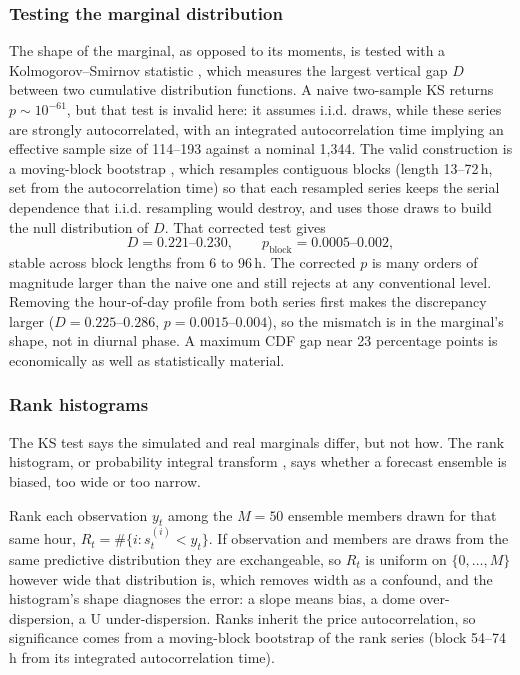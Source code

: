 \documentclass[11pt]{article}
\begin{document}
\subsubsection{Testing the marginal distribution}
The shape of
the marginal, as opposed to its moments, is tested with a
Kolmogorov--Smirnov statistic \cite{massey1951}, which measures the
largest vertical gap $D$ between two cumulative distribution functions. A
naive two-sample KS returns
$p \sim 10^{-61}$, but that test is invalid here: it assumes i.i.d. draws,
while these series are strongly autocorrelated, with an integrated
autocorrelation time implying an effective sample size of 114--193 against
a nominal 1{,}344. The valid construction is a moving-block bootstrap
\cite{kunsch1989}, which resamples contiguous blocks (length 13--72\,h,
set from the autocorrelation time) so that each resampled series keeps the
serial dependence that i.i.d. resampling would destroy, and uses those
draws to build the null distribution of $D$. That
corrected test gives
\begin{equation}
D = 0.221\text{--}0.230, \qquad p_{\text{block}} = 0.0005\text{--}0.002,
\label{eq:ks}
\end{equation}
stable across block lengths from 6 to 96\,h. The corrected $p$ is many
orders of magnitude larger than the naive one and still rejects at any
conventional level. Removing the hour-of-day profile from both series
first makes the discrepancy larger ($D = 0.225$--$0.286$,
$p = 0.0015$--$0.004$), so the mismatch is in the marginal's shape, not
in diurnal phase. A maximum CDF gap near 23 percentage points is
economically as well as statistically material.

\subsubsection{Rank histograms}
The KS test says the simulated and real marginals differ, but not how. The
rank histogram, or probability integral transform
\cite{hamill2001,gneiting2007}, says whether a forecast ensemble is biased,
too wide or too narrow.

Rank each observation $y_t$ among the
$M = 50$ ensemble members drawn for that same hour,
$R_t = \#\{i : s^{(i)}_t < y_t\}$. If observation and members are draws
from the same predictive distribution they are exchangeable, so $R_t$ is
uniform on $\{0,\dots,M\}$ however wide that distribution is, which
removes width as a confound, and the histogram's shape diagnoses the
error: a slope means bias, a dome over-dispersion, a U under-dispersion.
Ranks inherit the price autocorrelation, so significance comes from a
moving-block bootstrap of the rank series (block 54--74\,h from its
integrated autocorrelation time).
\end{document}
